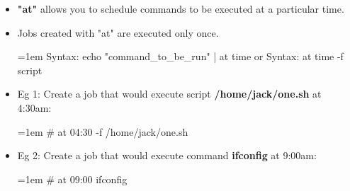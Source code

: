 \setlength{\columnsep}{3pt}
\begin{flushleft}
	\bigskip
	\begin{itemize}
		\item \textbf{"at"} allows you to schedule commands to be executed at a particular time. 
		\item Jobs created with "at" are executed only once.
		\begin{tcolorbox}[breakable,notitle,boxrule=-0pt,colback=pink,colframe=pink]
			\color{black}
			\font=1em
			Syntax: echo "command\_to\_be\_run" | at time
			\newline
			or
			\newline
			Syntax: at time -f script
			\font=4pt
		\end{tcolorbox}
	
		\item Eg 1: Create a job that would execute script \textbf{/home/jack/one.sh} at 4:30am:
		\begin{tcolorbox}[breakable,notitle,boxrule=-0pt,colback=teal,colframe=teal]
			\color{white}
			\font=1em
			\# at 04:30 -f /home/jack/one.sh
			\font=4pt
		\end{tcolorbox}
		
		\item Eg 2: Create a job that would execute command \textbf{ifconfig} at 9:00am:
		\begin{tcolorbox}[breakable,notitle,boxrule=-0pt,colback=teal,colframe=teal]
			\color{white}
			\font=1em
			\# at 09:00 ifconfig
			\font=4pt
		\end{tcolorbox}
		
		
	\end{itemize}
	
	
	
\end{flushleft}
\newpage





